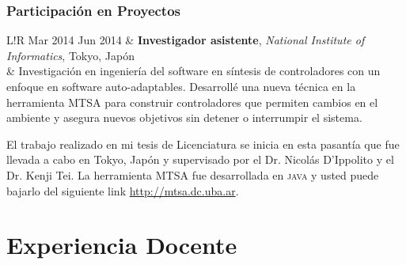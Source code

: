 \documentclass[10pt]{article}
\newcommand\VRule{\color{lightgray}\vrule width 0.5pt}
\begin{document}
\subsubsection*{Participación en Proyectos}

\begin{tabular}{L!{\VRule}R}
Mar 2014 Jun 2014 & \textbf{Investigador asistente}, \textit{National Institute of Informatics}, Tokyo, Japón\\
& \vspace{-0.7cm} Investigación en ingeniería del software en síntesis de controladores con un enfoque en software auto-adaptables.
Desarrollé una nueva técnica en la herramienta MTSA para construir controladores que permiten cambios en el ambiente y
asegura nuevos objetivos sin detener o interrumpir el sistema.

El trabajo realizado en mi tesis de Licenciatura se inicia en esta pasantía que fue llevada a cabo en Tokyo, Japón y
supervisado por el Dr. Nicolás D'Ippolito y el Dr. Kenji Tei. La herramienta MTSA fue desarrollada en \textsc{java} y
usted puede bajarlo del siguiente link \url{http://mtsa.dc.uba.ar}.\\
\end{tabular}


\section*{Experiencia Docente}
\end{document}
